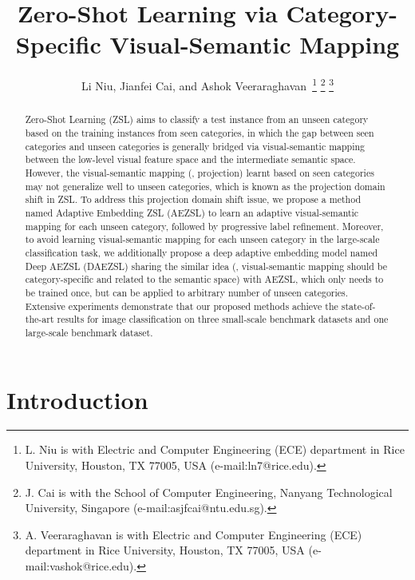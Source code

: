 \documentclass[journal]{IEEEtran}
\begin{document}
\title{Zero-Shot Learning via Category-Specific Visual-Semantic Mapping}

\author{Li Niu, Jianfei Cai, and Ashok Veeraraghavan\
\thanks{L. Niu is with Electric and Computer Engineering (ECE) department in Rice University, Houston, TX 77005, USA (e-mail:ln7@rice.edu).}
\thanks{J. Cai is with the School of Computer Engineering, Nanyang Technological University, Singapore (e-mail:asjfcai@ntu.edu.sg).}
\thanks{A. Veeraraghavan is with Electric and Computer Engineering (ECE) department in Rice University, Houston, TX 77005, USA (e-mail:vashok@rice.edu).}
}

\maketitle

\begin{abstract}
Zero-Shot Learning (ZSL) aims to classify a test instance from an unseen category based on the training instances from seen categories, in which the gap between seen categories and unseen categories is generally bridged via visual-semantic mapping between the low-level visual feature space and the intermediate semantic space. However, the visual-semantic mapping (\ie, projection) learnt based on seen categories may not generalize well to unseen categories, which is known as the projection domain shift in ZSL. To address this projection domain shift issue, we propose a method named Adaptive Embedding ZSL (AEZSL) to learn an adaptive visual-semantic mapping for each unseen category, followed by progressive label refinement. Moreover, to avoid learning visual-semantic mapping for each unseen category in the large-scale classification task, we additionally propose a deep adaptive embedding model named Deep AEZSL (DAEZSL) sharing the similar idea (\ie, visual-semantic mapping should be category-specific and related to the semantic space) with AEZSL, which only needs to be trained once, but can be applied to arbitrary number of unseen categories.
Extensive experiments demonstrate that our proposed methods achieve the state-of-the-art results for image classification on three small-scale benchmark datasets and one large-scale benchmark dataset.
\end{abstract}

\section{Introduction} \label{sec:intro}
\end{document}
